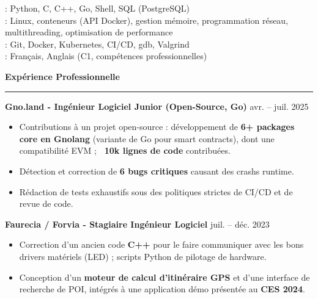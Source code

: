 \documentclass[9pt]{extarticle}
\begin{document}
\hspace*{5pt}{\bfseries Langages}: Python, C, C++, Go, Shell, SQL (PostgreSQL)
\\
\hspace*{5pt}{\bfseries Systèmes}: Linux, conteneurs (API Docker), gestion mémoire, programmation réseau, multithreading, optimisation de performance
\\
\hspace*{5pt}{\bfseries Outils}: Git, Docker, Kubernetes, CI/CD, gdb, Valgrind
\\
\hspace*{5pt}{\bfseries Langues}: Français, Anglais (C1, compétences professionnelles)

\par\vspace{5pt}

{\large\bfseries Expérience Professionnelle}
\par\vspace{-8pt}
\rule{\linewidth}{0.4pt}
\par\vspace{5pt}

{\bfseries Gno.land - Ingénieur Logiciel Junior (Open-Source, Go)} \hfill avr. -- juil. 2025
\begin{itemize}[noitemsep, topsep=0pt]
	\item Contributions à un projet open-source : développement de {\bfseries 6+ packages core en Gnolang} (variante de Go pour smart contracts), dont une compatibilité EVM ; {\bfseries ~10k lignes de code} contribuées.
	\item Détection et correction de {\bfseries 6 bugs critiques} causant des crashs runtime.
	\item Rédaction de tests exhaustifs sous des politiques strictes de CI/CD et de revue de code.
\end{itemize}

\par\vspace{5pt}

{\bfseries Faurecia / Forvia - Stagiaire Ingénieur Logiciel} \hfill juil. -- déc. 2023
\begin{itemize}[noitemsep, topsep=0pt]
	\item Correction d'un ancien code {\bfseries C++} pour le faire communiquer avec les bons drivers matériels (LED) ; scripts Python de pilotage de hardware.
	\item Conception d'un {\bfseries moteur de calcul d'itinéraire GPS} et d'une interface de recherche de POI, intégrés à une application démo présentée au {\bfseries CES 2024}.
\end{itemize}
\end{document}
